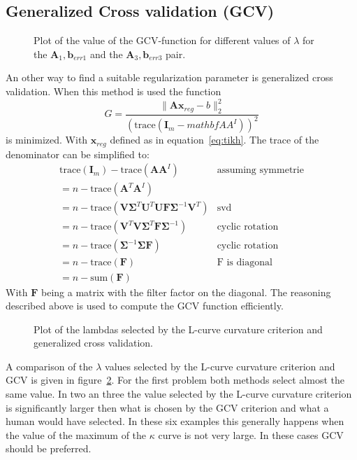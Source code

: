 \subsection{Generalized Cross validation (GCV)}
\begin{figure}
\centering


\caption{Plot of the value of the GCV-function for different values of $\lambda$ for the $\mathbf{A}_1, \mathbf{b}_{err1}$ and the $\mathbf{A}_3, \mathbf{b}_{err3}$ pair.}
\label{fig:GCVA1}
\end{figure}
An other way to find a suitable regularization parameter is generalized cross validation. When this method is used the function
\begin{equation}
G = \frac{\| \mathbf{Ax}_{reg} - b \|^2_2}{(\text{trace}(\mathbf{I}_m - mathbf{AA}^I))^2}
\end{equation}
is minimized. With $\mathbf{x}_{reg}$ defined as in equation~\ref{eq:tikh}. The trace of the denominator can be simplified to:
\begin{eqnarray}
\text{trace}(\mathbf{I}_m) - \text{trace}(\mathbf{AA}^I) & \text{assuming symmetrie} \\
= n - \text{trace}(\mathbf{A}^T \mathbf{A}^I) \\
= n - \text{trace}(\mathbf{V}\mathbf{\Sigma}^T \mathbf{U}^T \mathbf{U}\mathbf{F}\mathbf{\Sigma}^{-1} \mathbf{V}^T) & \text{svd} \\
= n - \text{trace}(\mathbf{V}^T \mathbf{V}\mathbf{\Sigma}^T \mathbf{F}\mathbf{\Sigma}^{-1} ) & \text{cyclic rotation} \\
= n - \text{trace}(\mathbf{\Sigma}^{-1}\mathbf{\Sigma} \mathbf{F} ) & \text{cyclic rotation} \\
= n - \text{trace}(\mathbf{F} ) & \text{F is diagonal}  \\
= n - \text{sum}(\mathbf{F})
\end{eqnarray}
With $\mathbf{F}$ being a matrix with the filter factor on the diagonal. The reasoning described above is used to compute the GCV function efficiently.
\begin{figure}
\centering

\caption{Plot of the lambdas selected by the L-curve curvature criterion and generalized cross validation.}
\label{fig:comparisonLGCV}
\end{figure}
A comparison of the $\lambda$ values selected by the L-curve curvature criterion and GCV is given in figure~\ref{fig:comparisonLGCV}. For the first problem both methods select almost the same value. In two an three the value selected by the L-curve curvature criterion is significantly larger then what is chosen by the GCV criterion and what a human would have selected. In these six examples this generally happens when the value of the maximum of the $\kappa$ curve is not very large. In these cases GCV should be preferred.
